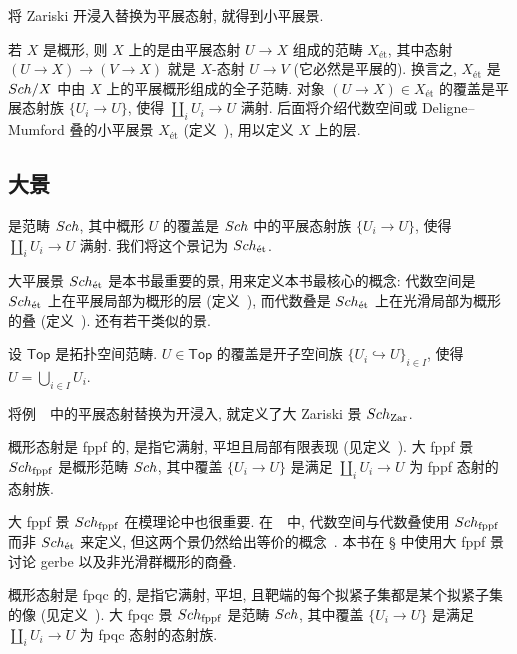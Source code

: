 将 Zariski 开浸入替换为平展态射, 就得到小平展景.
\begin{example}[小平展景]\label{src:3.2.4}
若 $X$ 是概形, 则 $X$ 上的是由平展态射 $U\to X$ 组成的范畴 $X_{\text{ét}}$, 其中态射 $(U\to X)\to(V\to X)$ 就是 $X$-态射 $U\to V$ (它必然是平展的). 换言之, $X_{\text{ét}}$ 是 $Sch/X$ 中由 $X$ 上的平展概形组成的全子范畴. 对象 $(U\to X)\in X_{\text{ét}}$ 的覆盖是平展态射族 $\{U_i\to U\}$, 使得 $\coprod_i U_i\to U$ 满射. 后面将介绍代数空间或 Deligne--Mumford 叠的小平展景 $X_{\text{ét}}$ (定义~), 用以定义 $X$ 上的层.
\end{example}

\subsection{大景}\label{src:3.2.2-subsection}
\begin{example}[大平展景]\label{src:3.2.5}
是范畴 $Sch$, 其中概形 $U$ 的覆盖是 $Sch$ 中的平展态射族 $\{U_i\to U\}$, 使得 $\coprod_i U_i\to U$ 满射. 我们将这个景记为 $Sch_{\text{ét}}$.
\end{example}
大平展景 $Sch_{\text{ét}}$ 是本书最重要的景, 用来定义本书最核心的概念: 代数空间是 $Sch_{\text{ét}}$ 上在平展局部为概形的层 (定义~), 而代数叠是 $Sch_{\text{ét}}$ 上在光滑局部为概形的叠 (定义~). 还有若干类似的景.
\begin{example}[大拓扑景]\label{src:3.2.6}
设 $\mathsf{Top}$ 是拓扑空间范畴. $U\in\mathsf{Top}$ 的覆盖是开子空间族 $\{U_i\hookrightarrow U\}_{i\in I}$, 使得 $U=\bigcup_{i\in I}U_i$.
\end{example}
\begin{example}[大 Zariski 景]\label{src:3.2.7}
将例~~中的平展态射替换为开浸入, 就定义了大 Zariski 景 $Sch_{\mathrm{Zar}}$.
\end{example}
\begin{example}[大 fppf 景]\label{src:3.2.8}
概形态射是 fppf 的, 是指它满射, 平坦且局部有限表现 (见定义~). 大 fppf 景 $Sch_{\mathrm{fppf}}$ 是概形范畴 $Sch$, 其中覆盖 $\{U_i\to U\}$ 是满足 $\coprod_i U_i\to U$ 为 fppf 态射的态射族.
\end{example}
大 fppf 景 $Sch_{\mathrm{fppf}}$ 在模理论中也很重要. 在~\cite{SP}~中, 代数空间与代数叠使用 $Sch_{\mathrm{fppf}}$ 而非 $Sch_{\text{ét}}$ 来定义, 但这两个景仍然给出等价的概念~\cite[Tag 076U]{SP}. 本书在 \S{} 中使用大 fppf 景讨论 gerbe 以及非光滑群概形的商叠.
\begin{example}[大 fpqc 景]\label{src:3.2.9}
概形态射是 fpqc 的, 是指它满射, 平坦, 且靶端的每个拟紧子集都是某个拟紧子集的像 (见定义~). 大 fpqc 景 $Sch_{\mathrm{fppf}}$ 是范畴 $Sch$, 其中覆盖 $\{U_i\to U\}$ 是满足 $\coprod_i U_i\to U$ 为 fpqc 态射的态射族.
\end{example}

